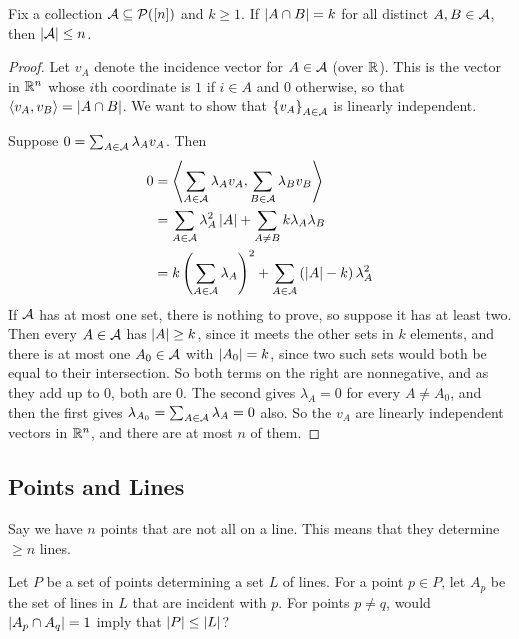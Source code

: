\begin{boxtheorem}
    Fix a collection $\mathcal{A} \subseteq \mathcal{P}\!\left( [n] \right)$ and $k \geq 1$. If $\left\lvert A \cap B \right\rvert = k$ for all distinct $A, B \in \mathcal{A}$, then $\left\lvert \mathcal{A} \right\rvert \leq n$.
\end{boxtheorem}
\begin{proof}
    Let $v_A$ denote the incidence vector for $A \in \mathcal{A}$ (over $\mathbb{R}$). This is the vector in $\mathbb{R}^n$ whose $i$th coordinate is $1$ if $i \in A$ and $0$ otherwise, so that $\left\langle v_A, v_B \right\rangle = \left\lvert A \cap B \right\rvert$.
    We want to show that $\left\{ v_A \right\}_{A \in \mathcal{A}}$ is linearly independent.

    Suppose $0 = \sum_{A \in \mathcal{A}} \lambda_A v_A$. Then
    \begin{align*}
        0
        &= \left\langle \sum_{A \in \mathcal{A}} \lambda_A v_A , \sum_{B \in \mathcal{A}} \lambda_B v_B \right\rangle \\
        &= \sum_{A \in \mathcal{A} } \lambda_A^2 \left\lvert A \right\rvert + \sum_{A \neq B} k \lambda_A \lambda_B \\
        &= k\left( \sum_{A \in \mathcal{A}} \lambda_A \right)^2 + \sum_{A \in \mathcal{A}}\left( \left\lvert A \right\rvert - k \right) \lambda_A^2
    \end{align*}
    If $\mathcal{A}$ has at most one set, there is nothing to prove, so suppose it has at least two. Then every $A \in \mathcal{A}$ has $\left\lvert A \right\rvert \geq k$, since it meets the other sets in $k$ elements, and there is at most one $A_0 \in \mathcal{A}$ with $\left\lvert A_0 \right\rvert = k$, since two such sets would both be equal to their intersection. So both terms on the right are nonnegative, and as they add up to $0$, both are $0$. The second gives $\lambda_A = 0$ for every $A \neq A_0$, and then the first gives $\lambda_{A_0} = \sum_{A \in \mathcal{A}} \lambda_A = 0$ also. So the $v_A$ are linearly independent vectors in $\mathbb{R}^n$, and there are at most $n$ of them.
\end{proof}

\subsection{Points and Lines}

Say we have $n$ points that are not all on a line. This means that they determine $\geq n$ lines.

Let $P$ be a set of points determining a set $L$ of lines. For a point $p \in P$, let $A_p$ be the set of lines in $L$ that are incident with $p$. For points $p \neq q$, would $\left\lvert A_p \cap A_q \right\rvert = 1$ imply that $\left\lvert P \right\rvert \leq \left\lvert L \right\rvert$?

